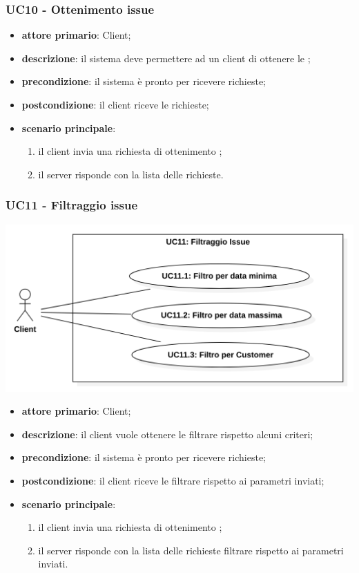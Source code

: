 \subsubsection{UC10 - Ottenimento issue}
\begin{itemize}
	\item \textbf{attore primario}: Client;
	\item \textbf{descrizione}: il sistema deve permettere ad un client di ottenere le ;
	\item \textbf{precondizione}: il sistema è pronto per ricevere richieste;
	\item \textbf{postcondizione}: il client riceve le  richieste;
	\item \textbf{scenario principale}: 
	\begin{enumerate}
		\item il client invia una richiesta di ottenimento ;
		\item il server risponde con la lista delle  richieste.
	\end{enumerate}
\end{itemize}
\subsubsection{UC11 - Filtraggio issue}
\begin{center}
	\includegraphics[keepaspectratio = true, width=15cm]{immagini/uc/8.png}
\end{center}
\begin{itemize}
	\item \textbf{attore primario}: Client;
	\item \textbf{descrizione}: il client vuole ottenere le  filtrare rispetto alcuni criteri;
	\item \textbf{precondizione}: il sistema è pronto per ricevere richieste;
	\item \textbf{postcondizione}:  il client riceve le  filtrare rispetto ai parametri inviati;
	\item \textbf{scenario principale}: 
	\begin{enumerate}
		\item il client invia una richiesta di ottenimento ;
		\item il server risponde con la lista delle  richieste filtrare rispetto ai parametri inviati.
	\end{enumerate}
\end{itemize}
